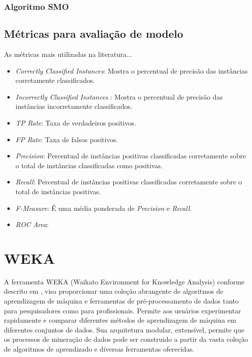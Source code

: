 \documentclass[
	12pt,				%
	openright,			%
	oneside,	
	a4paper,				%
	english,				%
	brazil				%
]{abntex2/abntex2} %
\begin{document}
	\subsubsection{Algoritmo SMO}

	\subsection{Métricas para avaliação de modelo}
	
	As métricas mais utilizadas na literatura...
	
		\begin{itemize}
			\item \textit{Correctly Classified Instances}: Mostra o percentual de precisão das instâncias corretamente classificados.
			\item \textit{Incorrectly Classified Instances} : Mostra o percentual de precisão das instâncias incorretamente classificados.
			\item \textit{TP Rate}: Taxa de verdadeiros positivos.
			\item \textit{FP Rate}: Taxa de falsos positivos.
			\item \textit{Precision}: Percentual de instâncias positivas classificadas corretamente sobre o total de instâncias classificadas como positivas.
			\item \textit{Recall}: Percentual de instâncias positivas classificadas corretamente sobre o total de instâncias positivas.
			\item \textit{F-Measure}: É uma média ponderada de \textit{Precision} e \textit{Recall}.
			\item \textit{ROC Area}: 
		\end{itemize}

	\section{WEKA}
	
	A ferramenta WEKA (Waikato Environment for Knowledge Analysis)  conforme descrito em \cite{hall:2009}, visa proporcionar uma coleção abrangente de algoritmos de aprendizagem de máquina e ferramentas de pré-processamento de dados tanto para pesquisadores como para profissionais. Permite aos usuários experimentar rapidamente e comparar diferentes métodos de aprendizagem de máquina em diferentes conjuntos de dados. Sua arquitetura modular, extensível, permite que os processos de mineração de dados pode ser construido a partir da vasta coleção de algoritmos de aprendizado e diversas ferramentas oferecidas.
		
\end{document}
